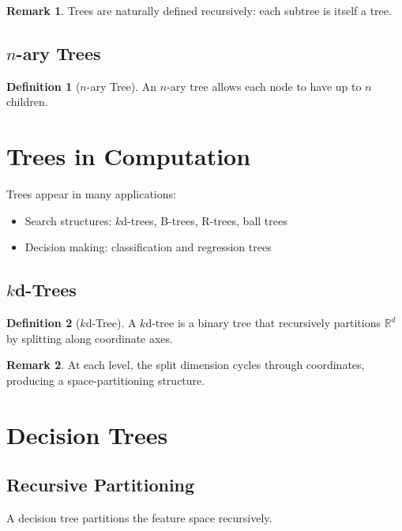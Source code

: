 \documentclass[12pt,oneside]{book}
\numberwithin{equation}{section}
\theoremstyle{definition}
\newtheorem{definition}{Definition}[section]
\newtheorem{remark}{Remark}[section]
\theoremstyle{plain}
\theoremstyle{remark}
\newcommand{\R}{\mathbb{R}}
\begin{document}
\begin{remark}
Trees are naturally defined recursively: each subtree is itself a tree.
\end{remark}

\subsection{$n$-ary Trees}

\begin{definition}[$n$-ary Tree]
An $n$-ary tree allows each node to have up to $n$ children.
\end{definition}

\section{Trees in Computation}

Trees appear in many applications:
\begin{itemize}
    \item Search structures: $k$d-trees, B-trees, R-trees, ball trees
    \item Decision making: classification and regression trees
\end{itemize}

\subsection{$k$d-Trees}

\begin{definition}[$k$d-Tree]
A $k$d-tree is a binary tree that recursively partitions $\R^d$ by splitting along coordinate axes.
\end{definition}

\begin{remark}
At each level, the split dimension cycles through coordinates, producing a space-partitioning structure.
\end{remark}

\section{Decision Trees}

\subsection{Recursive Partitioning}

A decision tree partitions the feature space recursively.
\end{document}
